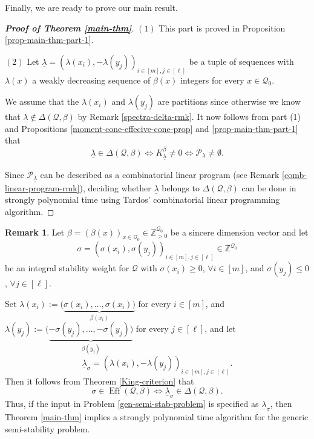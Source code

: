 \documentclass[11pt]{article}
\theoremstyle{definition}
\newtheorem{rema}[theo]{Remark}
\numberwithin{equation}{section}
\newcommand{\p}{\mathcal{P}}
\newcommand{\ZZ}{\mathbb Z}
\newcommand{\Q}{\mathbf{\mathcal{Q}}}
\newcommand{\unlm}{\underline{\lambda}}
\newcommand{\Eff}{\operatorname{Eff}}
\begin{document}
Finally, we are ready to prove our main result.

\begin{proof}[\textbf{Proof of Theorem \ref{main-thm}}] $(1)$ This part is proved in Proposition \ref{prop-main-thm-part-1}.

$(2)$ Let $\underline{\lambda}=(\lambda(x_i), -\lambda(y_j))_{i \in [m], j \in [\ell]}$ be a tuple of sequences with $\lambda(x)$ a weakly decreasing sequence of $\beta(x)$ integers for every $x \in \Q_0$.

We assume that the $\lambda(x_i)$ and $\lambda(y_j)$ are partitions since otherwise we know that $\underline{\lambda} \notin \Delta(\Q, \beta)$ by Remark \ref{spectra-delta-rmk}. It now follows from part (1) and Propositions \ref{moment-cone-effecive-cone-prop} and \ref{prop-main-thm-part-1} that
$$
\underline{\lambda} \in \Delta(\Q, \beta) \Longleftrightarrow K^{\beta}_{\unlm} \neq 0 \Longleftrightarrow \p_{\unlm} \neq \emptyset.
$$

Since $\p_{\unlm}$ can be described as a combinatorial linear program (see Remark \ref{comb-linear-program-rmk}), deciding whether $\underline{\lambda}$ belongs to $\Delta(\Q, \beta)$ can be done in strongly polynomial time using Tardos' \cite{Tar86} combinatorial linear programming algorithm.
\end{proof}


\begin{rema}\label{rmk-non-natural-input-form} Let $\beta=(\beta(x))_{x \in \Q_0 } \in \ZZ_{>0}^{\Q_0}$ be a sincere dimension vector and let 
\[
\sigma=(\sigma(x_i), \sigma(y_j))_{i \in [m], j \in [\ell]} \in \ZZ^{\Q_0}
\]
be an integral stability weight for $\Q$ with $\sigma(x_i) \geq 0$, $\forall i \in [m]$, and $\sigma(y_j) \leq 0$, $\forall j \in [\ell]$. 

Set $\lambda(x_i):=(\underbrace{\sigma(x_i), \ldots, \sigma(x_i))}_{\beta(x_i)}$ for every $i \in [m]$, and $\lambda(y_j):=(\underbrace{-\sigma(y_j), \ldots, -\sigma(y_j))}_{\beta(y_j)}$ for every $j \in [\ell]$, and let 
$$
\underline{\lambda}_{\sigma}=(\lambda(x_i), -\lambda(y_j))_{i \in [m], j \in [\ell]}.
$$
Then it follows from Theorem \ref{King-criterion} that
$$
\sigma \in \Eff(\Q, \beta) \Longleftrightarrow \underline{\lambda}_{\sigma} \in \Delta(\Q, \beta).
$$
Thus, if the input in Problem \ref{gen-semi-stab-problem}  is specified as $\underline{\lambda}_{\sigma}$, then Theorem \ref{main-thm} implies a strongly polynomial time algorithm for the generic semi-stability problem.  
\end{rema}
\end{document}
